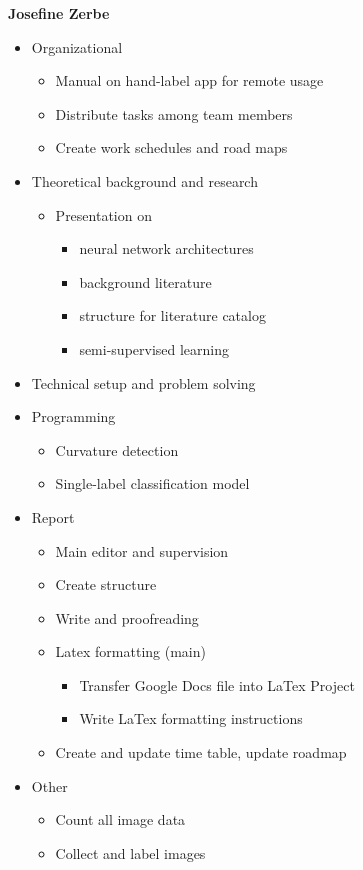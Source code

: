 \bigskip
\textbf{Josefine Zerbe}
\begin{itemize}
	\item Organizational
	\begin{itemize}
		\item Manual on hand-label app for remote usage
		\item Distribute tasks among team members
		\item Create work schedules and road maps
	\end{itemize}
	\item Theoretical background and research
	\begin{itemize}
		\item Presentation on
		\begin{itemize}
			\item neural network architectures
			\item background literature
			\item structure for literature catalog
			\item semi-supervised learning
		\end{itemize}
	\end{itemize}
	\item Technical setup and problem solving
	\item Programming
	\begin{itemize}
		\item Curvature detection
		\item Single-label classification model
	\end{itemize}
	\item Report
	\begin{itemize}
		\item Main editor and supervision
		\item Create structure
		\item Write and proofreading
		\item Latex formatting (main)
		\begin{itemize}
			\item Transfer Google Docs file into LaTex Project
			\item Write LaTex formatting instructions
		\end{itemize}
		\item Create and update time table, update roadmap
	\end{itemize}
	\item Other
	\begin{itemize}
		\item Count all image data
		\item Collect and label images
	\end{itemize}
\end{itemize}



